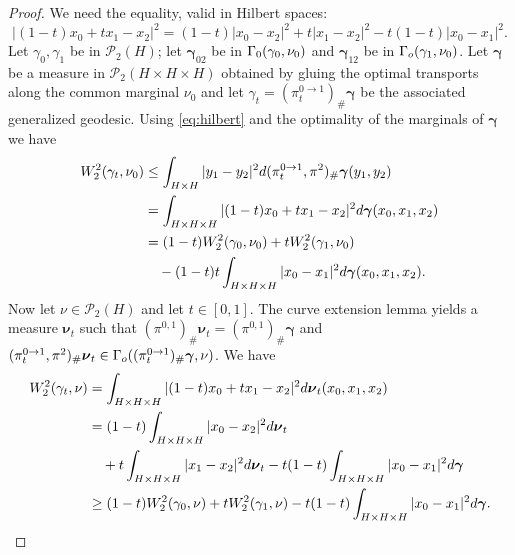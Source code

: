 \documentclass[12pt,a4paper]{article}
\renewcommand{\P}{\mathcal{P}}
\renewcommand{\d}{{\rm d}}
\newcommand{\g}{\boldsymbol{\gamma}}
\newcommand{\X}{\mathcal{P}_2(H)}
\theoremstyle{plain}
\theoremstyle{definition}
\begin{document}
\begin{proof}
    We need the equality, valid in Hilbert spaces:
    \begin{equation}
    \label{eq:hilbert}
    |(1-t)x_0 + tx_1 - x_2|^2 = (1-t)|x_0-x_2|^2 + t|x_1 - x_2|^2 - t(1-t)|x_0-x_1|^2.
    \end{equation}
    Let $\gamma_0, \gamma_1$ be in $\X$; let $\boldsymbol{\gamma}_{02}$ be in $\Gamma_{\rm 0}(\gamma_0, \nu_0)$ and $\boldsymbol{\gamma}_{12}$ be in $\Gamma_{\rm o}(\gamma_1, \nu_0)$. Let $\g$ be a measure in $\P_2(H \times H \times H)$ obtained by gluing the optimal transports along the common marginal $\nu_0$ and let $\gamma_t = (\pi^{0 \to 1}_t)_{\#} \boldsymbol{\gamma}$ be the associated generalized geodesic. Using \eqref{eq:hilbert} and the optimality of the marginals of $\boldsymbol{\gamma}$ we have
    \begin{equation*}
    \begin{split}
         W_2^2(\gamma_t, \nu_0) & \leq \int_{H \times H} |y_1 - y_2|^2 \d (\pi_t^{0\to 1},\pi^2)_\# \g (y_1,y_2)\\
        & = \int_{H \times H \times H} |(1-t)x_{0} + tx_1 - x_2|^2 \d\g(x_0,x_1,x_2)\\
        & = (1-t)W_2^2(\gamma_{0},\nu_0) + tW_2^2(\gamma_1,\nu_0) \\
        &\quad - (1-t)t \int_{H \times H \times H} |x_{0} - x_1|^2 \d\g(x_0,x_1,x_2).
    \end{split}
    \end{equation*}
    Now let $\nu \in \X$ and let $t \in [0,1]$. The curve extension lemma yields a measure $\boldsymbol{\nu}_t$ such that $(\pi^{0,1})_{\#} \boldsymbol{\nu}_t = (\pi^{0,1})_{\#}\g$ and $(\pi^{0\to 1}_t, \pi^2)_{\#} \boldsymbol{\nu}_t \in \Gamma_{\rm o}((\pi^{0\to1}_t)_{\#} \g, \nu)$. We have 
    \begin{equation*}
    \begin{split}
         W_2^2(\gamma_t, \nu) & = \int_{H \times H \times H} |(1-t)x_0 + tx_1 - x_2|^2 \d\boldsymbol{\nu}_t(x_0,x_1,x_2) \\
        & = (1-t) \int_{H \times H \times H} |x_0 - x_2|^2 \d\boldsymbol{\nu}_t \\
        &\quad + t \int_{H \times H \times H} |x_1 - x_2|^2 \d \boldsymbol{\nu}_t - t(1-t) \int_{H \times H \times H} |x_{0}-x_1|^2 \d\g \\
        & \geq (1-t) W_2^2(\gamma_{0}, \nu) + t W_2^2(\gamma_1, \nu) - t(1-t) \int_{H \times H \times H} |x_{0}-x_1|^2 \d\g.
    \end{split}

\end{equation*}
\end{proof}
\end{document}
